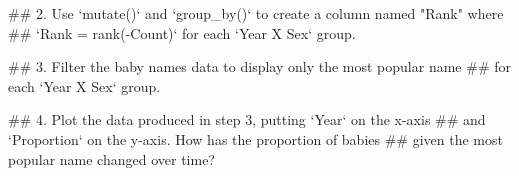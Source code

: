 \documentclass[]{book}
\newenvironment{Shaded}{\begin{snugshade}}{\end{snugshade}}
\newcommand{\KeywordTok}[1]{\textcolor[rgb]{0.13,0.29,0.53}{\textbf{#1}}}
\newcommand{\DataTypeTok}[1]{\textcolor[rgb]{0.13,0.29,0.53}{#1}}
\newcommand{\DecValTok}[1]{\textcolor[rgb]{0.00,0.00,0.81}{#1}}
\newcommand{\StringTok}[1]{\textcolor[rgb]{0.31,0.60,0.02}{#1}}
\newcommand{\OperatorTok}[1]{\textcolor[rgb]{0.81,0.36,0.00}{\textbf{#1}}}
\newcommand{\NormalTok}[1]{#1}
\begin{document}
\begin{Shaded}
\begin{Highlighting}[]
\NormalTok{## 2.  Use `mutate()` and `group_by()` to create a column named "Rank" where }
\NormalTok{##     `Rank = rank(-Count)` for each `Year X Sex` group.}
\end{Highlighting}
\end{Shaded}

\begin{Shaded}
\end{Shaded}

\begin{Shaded}
\begin{Highlighting}[]
\NormalTok{## 3.  Filter the baby names data to display only the most popular name }
\NormalTok{##     for each `Year X Sex` group.}
\end{Highlighting}
\end{Shaded}

\begin{Shaded}
\end{Shaded}

\begin{Shaded}
\begin{Highlighting}[]
\NormalTok{## 4. Plot the data produced in step 3, putting `Year` on the x-axis}
\NormalTok{##    and `Proportion` on the y-axis. How has the proportion of babies}
\NormalTok{##    given the most popular name changed over time?}
\end{Highlighting}
\end{Shaded}
\end{document}
